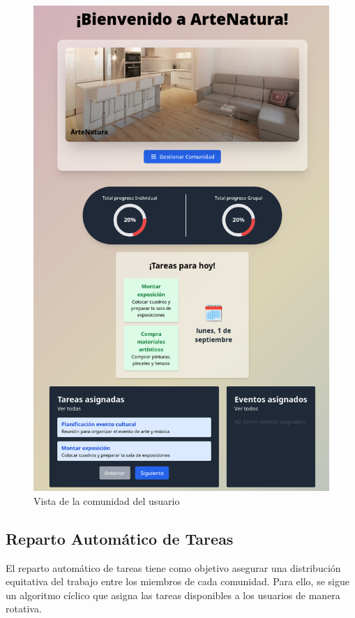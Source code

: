 \begin{figure}[H]
  \centering
  \includegraphics[width=1\textwidth]{fotos/comunidad-memoria.png}
  \caption{Vista de la comunidad del usuario}
  \label{fig:comunidad-memoria}
\end{figure}
\subsection*{Reparto Automático de Tareas}

El reparto automático de tareas tiene como objetivo asegurar una distribución equitativa del trabajo entre los miembros de cada comunidad. Para ello, se sigue un algoritmo cíclico que asigna las tareas disponibles a los usuarios de manera rotativa.

